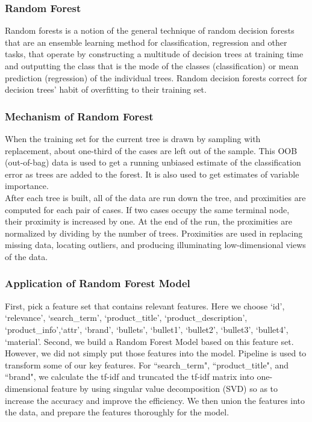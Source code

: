 \documentclass{sig-alternate-05-2015}
\begin{document}
\subsubsection{Random Forest}
Random forests is a notion of the general technique of random decision  
forests that are an ensemble learning method for classification, regression and 
other tasks, that operate by constructing a multitude of decision trees at training time and outputting the class that is the mode of the classes (classification) or mean prediction (regression) of the individual trees. Random decision forests correct for decision trees' habit of overfitting to their training set.

\subsubsection{Mechanism of Random Forest}
When the training set for the current tree is drawn by sampling with replacement, about one-third of the cases are left out of the sample. This OOB (out-of-bag) data is used to get a running unbiased estimate of the classification error as trees are added to the forest. It is also used to get estimates of variable importance.\\

After each tree is built, all of the data are run down the tree, and proximities are computed for each pair of cases. If two cases occupy the same terminal node, their proximity is increased by one. At the end of the run, the proximities are normalized by dividing by the number of trees. Proximities are used in replacing missing data, locating outliers, and producing illuminating low-dimensional views of the data.

\subsubsection{Application of Random Forest Model}

First, pick a feature set that contains relevant features. Here we choose \lq id', \lq relevance', \lq search\_term', \lq product\_title', \lq product\_description', \lq product\_info',\lq attr', \lq brand', \lq bullets', \lq bullet1', \lq bullet2', \lq bullet3', \lq bullet4', \lq material'. Second, we build a Random Forest Model based on this feature set. However, we did not simply put those features into the model. Pipeline is used to transform some of our key features. For ``search\_term", ``product\_title", and ``brand", we calculate the tf-idf and truncated the tf-idf matrix into one-dimensional feature by using singular value decomposition (SVD) so as to increase the accuracy and improve the efficiency. We then union the features into the data, and prepare the features thoroughly for the model.\\
\end{document}

